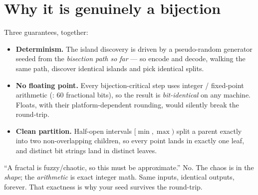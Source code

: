 \documentclass[a4paper,11pt]{report}
\begin{document}
\begin{center}
\end{center}

\section{Why it is genuinely a bijection}
Three guarantees, together:
\begin{itemize}[leftmargin=1.4em,nosep]
\item \textbf{Determinism.} The island discovery is driven by a pseudo-random
generator seeded from the \emph{bisection path so far} — so encode and decode,
walking the same path, discover identical islands and pick identical splits.
\item \textbf{No floating point.} Every bijection-critical step uses integer /
fixed-point arithmetic (: 60 fractional bits), so the result is
\emph{bit-identical} on any machine. Floats, with their platform-dependent
rounding, would silently break the round-trip.
\item \textbf{Clean partition.} Half-open intervals $[\min,\max)$ split a parent
exactly into two non-overlapping children, so every point lands in exactly one
leaf, and distinct bit strings land in distinct leaves.
\end{itemize}

\begin{pitfall}
``A fractal is fuzzy/chaotic, so this must be approximate.'' No. The chaos is in
the \emph{shape}; the \emph{arithmetic} is exact integer math. Same inputs,
identical outputs, forever. That exactness is why your seed survives the
round-trip.
\end{pitfall}
\end{document}
